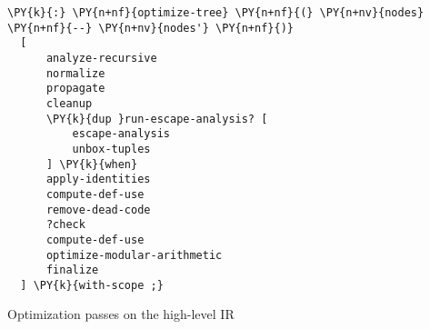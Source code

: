 \centering

\begin{Verbatim}[commandchars=\\\{\},frame=single]
\PY{k}{:} \PY{n+nf}{optimize-tree} \PY{n+nf}{(} \PY{n+nv}{nodes} \PY{n+nf}{--} \PY{n+nv}{nodes'} \PY{n+nf}{)}
  [
      analyze-recursive
      normalize
      propagate
      cleanup
      \PY{k}{dup }run-escape-analysis? [
          escape-analysis
          unbox-tuples
      ] \PY{k}{when}
      apply-identities
      compute-def-use
      remove-dead-code
      ?check
      compute-def-use
      optimize-modular-arithmetic
      finalize
  ] \PY{k}{with-scope ;}
\end{Verbatim}

\caption{Optimization passes on the high-level IR}
